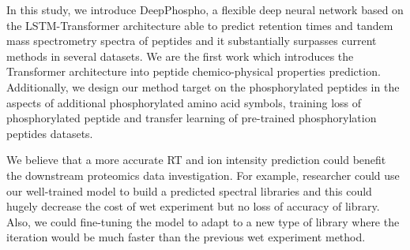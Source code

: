 In this study, we introduce DeepPhospho, a flexible deep neural network based on the LSTM-Transformer architecture able to predict retention times and tandem mass spectrometry spectra of peptides and it substantially surpasses current methods in several datasets. We are the first work which introduces the Transformer architecture into peptide chemico-physical properties prediction. Additionally, we design our method target on the phosphorylated peptides in the aspects of additional phosphorylated amino acid symbols, training loss of phosphorylated peptide and transfer learning of pre-trained phosphorylation peptides datasets.

We believe that a more accurate RT and ion intensity prediction could benefit the downstream proteomics data investigation. For example, researcher could use our well-trained model to build 
a predicted spectral libraries and this could hugely decrease the cost of wet experiment but no loss of accuracy of library. Also, we could fine-tuning the model to adapt to a new type of library where the iteration would be much faster  than the previous wet experiment method. 
